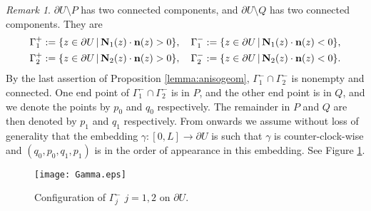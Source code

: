\documentclass[11pt]{amsart}
\theoremstyle{plain}
\theoremstyle{remark}
\newtheorem{Rem}[Thm]{Remark}
\numberwithin{equation}{section}
\numberwithin{Thm}{section}
\def\N{{\mathbf N}}
\def\n{{\bf n}}
\begin{document}
\begin{Rem} \label{defs}
$\partial U \setminus P$ has two connected components, and $\partial U\setminus Q$ has two connected components. They are
\begin{equation}\label{Gammas}
\begin{aligned}
\Gamma_1^+&:=\{z\in\partial U\,|\, \N_1(z)\cdot\n(z)>0\}, \quad \Gamma_1^-:=\{z\in\partial U\,|\, \N_1(z)\cdot\n(z)<0\},\\
\Gamma_2^+&:=\{z\in\partial U\,|\, \N_2(z)\cdot\n(z)>0\}, \quad \Gamma_2^-:=\{z\in\partial U\,|\, \N_2(z)\cdot\n(z)<0\}. 
\end{aligned}
\end{equation}
By the last assertion of Proposition \ref{lemma:anisogeom}, $\Gamma_1^- \cap \Gamma_2^-$ is nonempty and connected. One end point of $\Gamma_1^- \cap \Gamma_2^-$ is in $P$, and the other end point is in $Q$, and we denote the points by $p_0$ and $q_0$ respectively. The remainder in $P$ and $Q$ are then denoted by $p_1$ and $q_1$ respectively. From onwards we assume without loss of generality that the embedding $\gamma :[0,L] \rightarrow \partial U$ is such that 
$\gamma$ is counter-clock-wise and $(q_0,p_0,q_1,p_1)$ is in the order of appearance in this embedding. See Figure \ref{fig1}.
\end{Rem}
\begin{figure}[ht]
  \center
  \texttt{[image: Gamma.eps]}
  \caption{Configuration of $\Gamma^-_j$ $j=1,2$ on $\partial U$.} \label{fig1}
\end{figure}
\end{document}
